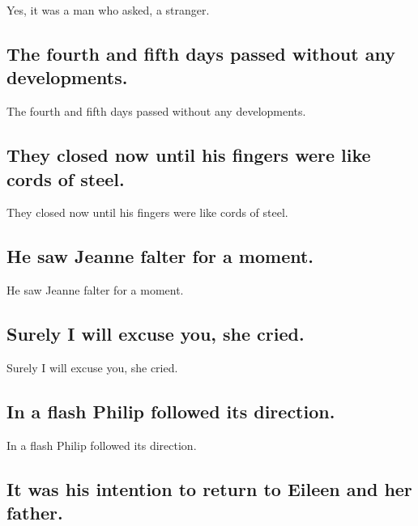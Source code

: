 \documentclass[]{article}
\begin{document}
Yes, it was a man who asked, a stranger.

\hypertarget{the-fourth-and-fifth-days-passed-without-any-developments.}{%
\subsection{The fourth and fifth days passed without any
developments.}\label{the-fourth-and-fifth-days-passed-without-any-developments.}}

The fourth and fifth days passed without any developments.

\hypertarget{they-closed-now-until-his-fingers-were-like-cords-of-steel.}{%
\subsection{They closed now until his fingers were like cords of
steel.}\label{they-closed-now-until-his-fingers-were-like-cords-of-steel.}}

They closed now until his fingers were like cords of steel.

\hypertarget{he-saw-jeanne-falter-for-a-moment.}{%
\subsection{He saw Jeanne falter for a
moment.}\label{he-saw-jeanne-falter-for-a-moment.}}

He saw Jeanne falter for a moment.

\hypertarget{surely-i-will-excuse-you-she-cried.}{%
\subsection{Surely I will excuse you, she
cried.}\label{surely-i-will-excuse-you-she-cried.}}

Surely I will excuse you, she cried.

\hypertarget{in-a-flash-philip-followed-its-direction.}{%
\subsection{In a flash Philip followed its
direction.}\label{in-a-flash-philip-followed-its-direction.}}

In a flash Philip followed its direction.

\hypertarget{it-was-his-intention-to-return-to-eileen-and-her-father.}{%
\subsection{It was his intention to return to Eileen and her
father.}\label{it-was-his-intention-to-return-to-eileen-and-her-father.}}
\end{document}
